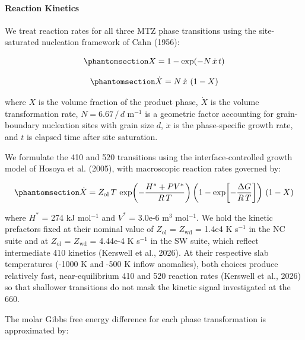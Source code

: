 \documentclass[draft,linenumbers]{agujournal2019}
\begin{document}
\paragraph{Reaction Kinetics}\label{sec:reaction-kinetics}

We treat reaction rates for all three MTZ phase transitions using the
site-saturated nucleation framework of Cahn (1956):

\begin{equation}\protect\phantomsection\label{eq:volume-fraction}{X = 1 - \exp\!\left(-N\, \dot{x}\, t \right)}\end{equation}

\begin{equation}\protect\phantomsection\label{eq:volume-transformation-rate}{\dot{X} = N\, \dot{x}\, \left(1 - X \right)}\end{equation}

where \(X\) is the volume fraction of the product phase, \(\dot{X}\) is
the volume transformation rate, \(N = \text{6.67}\, /\, d\) m\(^{-1}\)
is a geometric factor accounting for grain-boundary nucleation sites
with grain size \(d\), \(\dot{x}\) is the phase-specific growth rate,
and \(t\) is elapsed time after site saturation.

We formulate the 410 and 520 transitions using the interface-controlled
growth model of Hosoya et al. (2005), with macroscopic reaction rates
governed by:

\begin{equation}\protect\phantomsection\label{eq:reaction-rate-410}{\dot{X} = Z_\mathrm{ol}\, T\, \exp\!\left(-\frac{H^{\ast} + P V^{\ast}}{R\, T}\right) \left(1 - \exp\!\left[-\frac{\Delta G}{R\, T}\right] \right)\, \left(1 - X \right)}\end{equation}

where \(H^{\ast}\) = 274 kJ mol\(^{-1}\) and \(V^{\ast}\) = 3.0e-6
m\(^3\) mol\(^{-1}\). We hold the kinetic prefactors fixed at their
nominal value of \(Z_\mathrm{ol}\) = \(Z_\mathrm{wd}\) = 1.4e4 K
s\(^{-1}\) in the NC suite and at \(Z_\mathrm{ol}\) = \(Z_\mathrm{wd}\)
= 4.44e-4 K s\(^{-1}\) in the SW suite, which reflect intermediate 410
kinetics (Kerswell et al., 2026). At their respective slab temperatures
(-1000 K and -500 K inflow anomalies), both choices produce relatively
fast, near-equilibrium 410 and 520 reaction rates (Kerswell et al.,
2026) so that shallower transitions do not mask the kinetic signal
investigated at the 660.

The molar Gibbs free energy difference for each phase transformation is
approximated by:
\end{document}
